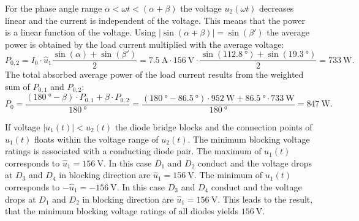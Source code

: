 \begin{solutionblock}
    For the phase angle range $\alpha<\omega t<(\alpha+\beta)$ the voltage $u_\mathrm{2}(\omega t)$ decreases linear and the current is independent of the voltage.
    This means that the power is a linear function of the voltage. Using $\left|\sin(\alpha+\beta)\right|=\sin(\beta')$ the average power is obtained by the load current multiplied
    with the average voltage:
    \begin{equation} 
        P_\mathrm{0,2}=I_{\mathrm{0}} \cdot \hat{u}_\mathrm{1}\frac{\sin(\alpha) + \sin(\beta')}{2}=
        \SI{7.5}{\ampere} \cdot \SI{156}{\volt} \cdot \frac{\sin(\SI{112.8}{\degree}) + \sin(\SI{19.3}{\degree})}{2}=
        \SI{733}{\watt}.
    \end{equation}
    The total absorbed average power of the load current results from the weighted sum of $P_\mathrm{0,1}$ and $P_\mathrm{0,2}$:
    \begin{equation} 
        P_\mathrm{0}=\frac{(\SI{180}{\degree}-\beta) \cdot P_\mathrm{0,1}+ \beta \cdot P_\mathrm{0,2}}{\SI{180}{\degree}}
        =\frac{(\SI{180}{\degree}-\SI{86.5}{\degree}) \cdot \SI{952}{\watt}+\SI{86.5}{\degree} \cdot \SI{733}{\watt}}{\SI{180}{\degree}}=\SI{847}{\watt}.
    \end{equation}
    
\end{solutionblock}

\begin{solutionblock}
    If voltage $\left| u_\mathrm{1}(t) \right| < u_\mathrm{2}(t)$ the diode bridge blocks and the connection points of $u_\mathrm{1}(t)$
    floats within the voltage range of $u_\mathrm{2}(t)$. The minimum blocking voltage ratings is associated with a conducting diode pair.
    The maximum of ${u}_\mathrm{1}(t)$ corresponds to $\hat{u}_\mathrm{1}=\SI{156}{\volt}$. In this case $D_\mathrm{1}$
    and $D_\mathrm{2}$ conduct and the voltage drops at $D_\mathrm{3}$ and $D_\mathrm{4}$ in blocking direction are $\hat{u}_\mathrm{1}=\SI{156}{\volt}$.
    The minimum of ${u}_\mathrm{1}(t)$ corresponds to $-\hat{u}_\mathrm{1}=-\SI{156}{\volt}$. In this case $D_\mathrm{3}$
    and $D_\mathrm{4}$ conduct and the voltage drops at $D_\mathrm{1}$ and $D_\mathrm{2}$ in blocking direction are $\hat{u}_\mathrm{1}=\SI{156}{\volt}$.
    This leads to the result, that the minimum blocking voltage ratings of all diodes yields $\SI{156}{\volt}$.
\end{solutionblock}

